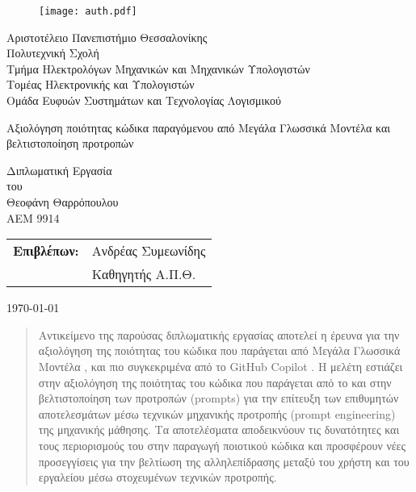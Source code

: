 \begin{titlepage}

  \begin{figure}[H]
    \begin{center}
      \texttt{[image: auth.pdf]}
      \label{fig:cover_auth_logo}
    \end{center}
  \end{figure}

  \centering \Large Αριστοτέλειο Πανεπιστήμιο Θεσσαλονίκης\\ \Large
  Πολυτεχνική Σχολή\\ \large Τμήμα Ηλεκτρολόγων Μηχανικών και Μηχανικών
  Υπολογιστών\\ \large Τομέας Ηλεκτρονικής και Υπολογιστών \\ \large Ομάδα Ευφυών Συστημάτων και Τεχνολογίας Λογισμικού 

  \vspace{
    \fill}

  \LARGE Αξιολόγηση ποιότητας κώδικα παραγόμενου από Μεγάλα Γλωσσικά Μοντέλα και βελτιστοποίηση προτροπών
 

  \vspace{
    \fill}

  \Large Διπλωματική Εργασία\\ \Large του\\ \Large Θεοφάνη Θαρρόπουλου\\ \Large ΑΕΜ 9914

  \vspace{
    \fill} \raggedright

  \begin{tabular}{ll}
    \textbf{Επιβλέπων:} & Ανδρέας Συμεωνίδης \\
    & Καθηγητής Α.Π.Θ.\\
  \end{tabular}

  \centering \vspace{
    \fill} \today

\end{titlepage}

\begin{abstract}
  Αντικείμενο της παρούσας διπλωματικής εργασίας αποτελεί η έρευνα για
  την αξιολόγηση της ποιότητας του κώδικα που παράγεται από Μεγάλα
  Γλωσσικά Μοντέλα , και πιο συγκεκριμένα από το
  \textlatin{GitHub Copilot} \cite{githubcopilot}. Η μελέτη εστιάζει στην
  αξιολόγηση της ποιότητας του κώδικα που παράγεται από το  και
  στην βελτιστοποίηση των προτροπών \textlatin{(prompts)} για την
  επίτευξη των επιθυμητών αποτελεσμάτων μέσω τεχνικών μηχανικής
  προτροπής \textlatin{(prompt engineering)} της μηχανικής μάθησης.
  Τα αποτελέσματα αποδεικνύουν τις δυνατότητες και τους περιορισμούς του
   στην παραγωγή ποιοτικού κώδικα και προσφέρουν νέες
  προσεγγίσεις για την βελτίωση της αλληλεπίδρασης μεταξύ του χρήστη και
  του εργαλείου μέσω στοχευμένων τεχνικών προτροπής.
\end{abstract}

